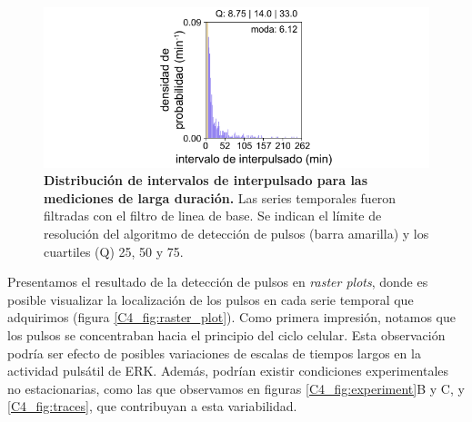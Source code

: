 \documentclass[./main.tex]{subfiles}
\begin{document}
\begin{figure}
    \centering
    \includegraphics[width=1\columnwidth]{figures/chapter4/C4_IPI.pdf}
    \caption{\textbf{Distribución de intervalos de interpulsado para las mediciones de larga duración.} Las series temporales fueron filtradas con el filtro de linea de base. Se indican el límite de resolución del algoritmo de detección de pulsos (barra amarilla) y los cuartiles (Q) 25, 50 y 75.}
    \label{C4_fig:IPI}
\end{figure}


Presentamos el resultado de la detección de pulsos en \textit{raster plots}, donde es posible visualizar la localización de los pulsos en cada serie temporal que adquirimos (figura \ref{C4_fig:raster_plot}). Como primera impresión, notamos que los pulsos se concentraban hacia el principio del ciclo celular. Esta observación podría ser efecto de posibles variaciones de escalas de tiempos largos en la actividad pulsátil de ERK. Además, podrían existir condiciones experimentales no estacionarias, como las que observamos en figuras \ref{C4_fig:experiment}B y C, y \ref{C4_fig:traces}, que contribuyan a esta variabilidad.
\end{document}
